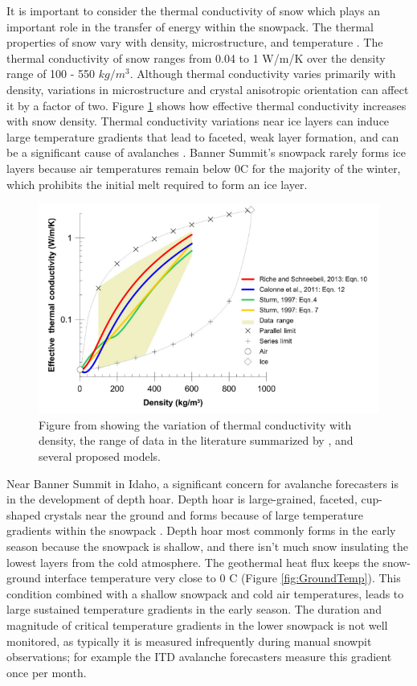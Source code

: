 It is important to consider the thermal conductivity of snow which plays an important role in the transfer of energy within the snowpack. The thermal properties of snow vary with density, microstructure, and temperature \citep{arenson2015physical}. The thermal conductivity of snow ranges from 0.04 to 1 W/m/K over the density range of 100 - 550 $kg/m^3$. Although thermal conductivity varies primarily with density, variations in microstructure and crystal anisotropic orientation can affect it by a factor of two. Figure \ref{fig:ThermalConductivity} shows how effective thermal conductivity increases with snow density. Thermal conductivity variations near ice layers can induce large temperature gradients that lead to faceted, weak layer formation, and can be a significant cause of avalanches \citep{arenson2015physical}. Banner Summit's snowpack rarely forms ice layers because air temperatures remain below 0\textdegree C for the majority of the winter, which prohibits the initial melt required to form an ice layer. 

 \begin{figure}[!t]
    \centering
    \includegraphics[width=0.8\linewidth]{figures/TempGrad/Density_Conductivity.png}
    \caption{Figure from \citet{arenson2015physical} showing the variation of thermal conductivity with density, the range of data in the literature summarized by \citet{sturm1997thermal}, and several proposed models.}
    \label{fig:ThermalConductivity}
 \end{figure}

Near Banner Summit in Idaho, a significant concern for avalanche forecasters is in the development of depth hoar. Depth hoar is large-grained, faceted, cup-shaped crystals near the ground and forms because of large temperature gradients within the snowpack \citep{akitaya1974}. Depth hoar most commonly forms in the early season because the snowpack is shallow, and there isn't much snow insulating the lowest layers from the cold atmosphere. The geothermal heat flux keeps the snow-ground interface temperature very close to 0 \textdegree C (Figure \ref{fig:GroundTemp}). This condition combined with a shallow snowpack and cold air temperatures, leads to large sustained temperature gradients in the early season. The duration and magnitude of critical temperature gradients in the lower snowpack is not well monitored, as typically it is measured infrequently during manual snowpit observations; for example the ITD avalanche forecasters measure this gradient once per month. 

